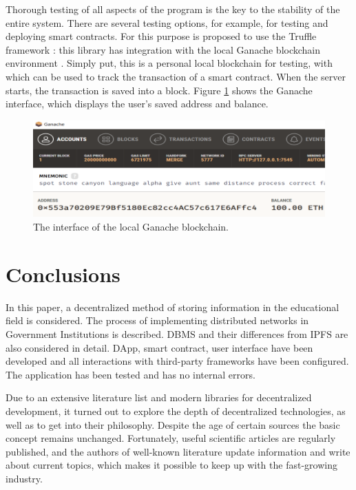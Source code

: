 \documentclass[10pt,conference,a4paper]{IEEEtran_EDM}
\begin{document}
Thorough testing of all aspects of the program is the key to the stability of the entire system.
There are several testing options, for example, for testing and deploying smart contracts.
For this purpose is proposed to use the Truffle framework \cite{Truffle}: this library has integration with the local Ganache blockchain environment \cite{Ganache}.
Simply put, this is a personal local blockchain for testing, with which can be used to track the transaction of a smart contract.
When the server starts, the transaction is saved into a block.
Figure \ref{GanacheB} shows the Ganache interface, which displays the user's saved address and balance.

\begin{figure}[htbp]
\centerline{\includegraphics[scale=0.51]{fig3.png}}
\caption{The interface of the local Ganache blockchain.}
\label{GanacheB}
\end{figure}

\section{Conclusions }
In this paper, a decentralized method of storing information in the educational field is considered.
The process of implementing distributed networks in Government Institutions is described.
DBMS and their differences from IPFS are also considered in detail.
DApp, smart contract, user interface have been developed and all interactions with third-party frameworks have been configured.
The application has been tested and has no internal errors.

Due to an extensive literature list and modern libraries for decentralized development, it turned out to explore the depth of decentralized technologies, as well as to get into their philosophy.
Despite the age of certain sources the basic concept remains unchanged.
Fortunately, useful scientific articles are regularly published, and the authors of well-known literature update information and write about current topics, which makes it possible to keep up with the fast-growing industry.
\end{document}
